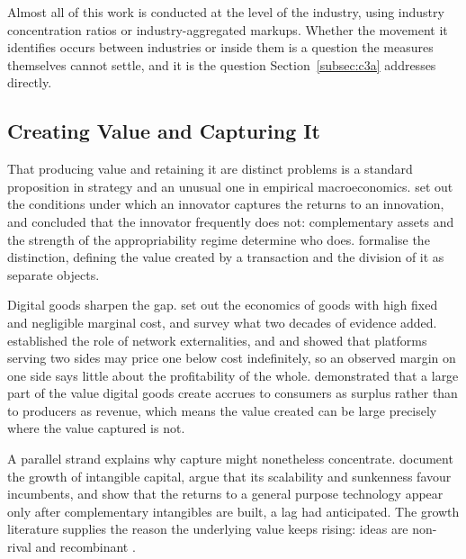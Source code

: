 \documentclass[jrfm,article,submit,pdftex,moreauthors]{Definitions/mdpi}
\begin{document}
Almost all of this work is conducted at the level of the industry, using industry
concentration ratios or industry-aggregated markups. Whether the movement it identifies
occurs between industries or inside them is a question the measures themselves cannot
settle, and it is the question Section~\ref{subsec:c3a} addresses directly.

\subsection{Creating Value and Capturing It}
\label{subsec:lit_capture}

That producing value and retaining it are distinct problems is a standard proposition in
strategy and an unusual one in empirical macroeconomics. \citet{Teece1986} set out the
conditions under which an innovator captures the returns to an innovation, and concluded
that the innovator frequently does not: complementary assets and the strength of the
appropriability regime determine who does. \citet{BrandenburgerStuart1996} formalise the
distinction, defining the value created by a transaction and the division of it as separate
objects.

Digital goods sharpen the gap. \citet{ShapiroVarian1998} set out the economics of goods with
high fixed and negligible marginal cost, and \citet{GoldfarbTucker2019} survey what two
decades of evidence added. \citet{KatzShapiro1985} established the role of network
externalities, and \citet{RochetTirole2003} and \citet{ParkerVanAlstyne2005} showed that
platforms serving two sides may price one below cost indefinitely, so an observed margin on
one side says little about the profitability of the whole. \citet{BrynjolfssonHuSmith2003}
demonstrated that a large part of the value digital goods create accrues to consumers as
surplus rather than to producers as revenue, which means the value created can be large
precisely where the value captured is not.

A parallel strand explains why capture might nonetheless concentrate.
\citet{CorradoHultenSichel2009} document the growth of intangible capital,
\citet{HaskelWestlake2018} argue that its scalability and sunkenness favour incumbents, and
\citet{BrynjolfssonRockSyverson2021} show that the returns to a general purpose technology
appear only after complementary intangibles are built, a lag \citet{BresnahanTrajtenberg1995}
had anticipated. The growth literature supplies the reason the underlying value keeps rising:
ideas are non-rival \citep{Romer1990} and recombinant \citep{Weitzman1998}.
\end{document}
